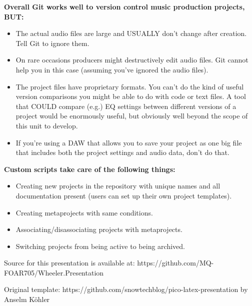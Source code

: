 \documentclass[unknownkeysallowed,usepdftitle=false, parskip=full]{beamer}
\newcommand{\secvariable}{nothing}
\newcommand{\mysection}[1]{\renewcommand{\secvariable}{#1}
}
\begin{document}
\mysection{Git}
\begin{frame}\label{\secvariable}
\parbox{\linewidth}{
    \textbf{Overall Git works well to version control music production projects, BUT:}
    \begin{itemize}
        \item The actual audio files are large and USUALLY don't change after creation. Tell Git to ignore them.
        \item On rare occasions producers might destructively edit audio files. Git cannot help you in this case (assuming you've ignored the audio files).
        \item The project files have proprietary formats. You can't do the kind of useful version comparisons you might be able to do with code or text files. A tool that COULD compare (e.g.) EQ settings between different versions of a project would be enormously useful, but obviously well beyond the scope of this unit to develop.
        \item If you're using a DAW that allows you to save your project as one big file that includes both the project settings and audio data, don't do that.
    \end{itemize}
}  
\end{frame}

\mysection{scripts}
\begin{frame}\label{\secvariable}
\parbox{\linewidth}{
\textbf{Custom scripts take care of the following things:}
\begin{itemize}
    \item Creating new projects in the repository with unique names and all documentation present (users can set up their own project templates).
    \item Creating metaprojects with same conditions.
    \item Associating/disassociating projects with metaprojects.
    \item Switching projects from being active to being archived.
\end{itemize}
}
\end{frame}

\mysection{credits}
\begin{frame}\label{\secvariable}
  
Source for this presentation is available at: https://github.com/MQ-FOAR705/Wheeler.Presentation

\vspace{12pt}

Original template: https://github.com/snowtechblog/pico-latex-presentation by Anselm Köhler
  
\end{frame}
\end{document}
